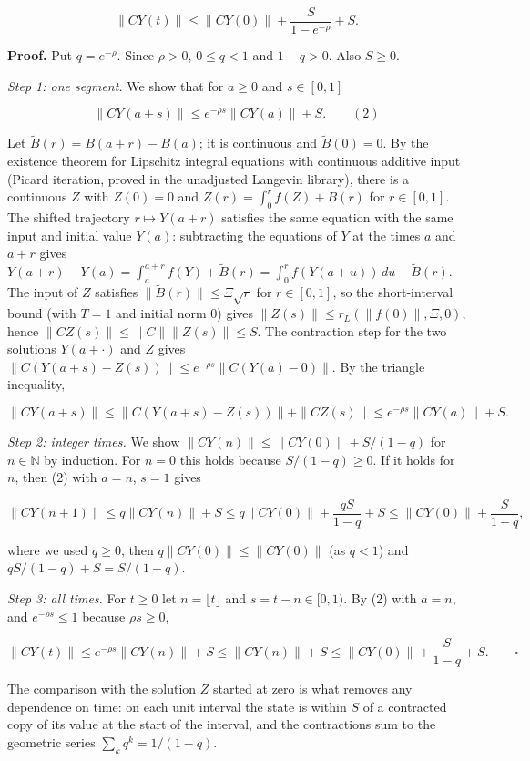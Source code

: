 \documentclass[11pt,a4paper]{report}
\begin{document}
\[\|CY(t)\|\le\|CY(0)\|+\frac{S}{1-e^{-\rho}}+S .\]


\textbf{Proof.} Put \(q=e^{-\rho}\). Since \(\rho>0\), \(0\le q<1\) and \(1-q>0\). Also \(S\ge0\).




\emph{Step 1: one segment.} We show that for \(a\ge0\) and \(s\in[0,1]\)


\[\|CY(a+s)\|\le e^{-\rho s}\|CY(a)\|+S.\qquad(2)\]


Let \(\tilde B(r)=B(a+r)-B(a)\); it is continuous and \(\tilde B(0)=0\). By the existence theorem for Lipschitz integral equations with continuous additive input (Picard iteration, proved in the unadjusted Langevin library), there is a continuous \(Z\) with \(Z(0)=0\) and \(Z(r)=\int_0^rf(Z)+\tilde B(r)\) for \(r\in[0,1]\). The shifted trajectory \(r\mapsto Y(a+r)\) satisfies the same equation with the same input and initial value \(Y(a)\): subtracting the equations of \(Y\) at the times \(a\) and \(a+r\) gives \(Y(a+r)-Y(a)=\int_a^{a+r}f(Y)+\tilde B(r)=\int_0^rf(Y(a+u))\,du+\tilde B(r)\). The input of \(Z\) satisfies \(\|\tilde B(r)\|\le\Xi\sqrt r\) for \(r\in[0,1]\), so the short-interval bound (with \(T=1\) and initial norm \(0\)) gives \(\|Z(s)\|\le r_L(\|f(0)\|,\Xi,0)\), hence \(\|CZ(s)\|\le\|C\|\|Z(s)\|\le S\). The contraction step for the two solutions \(Y(a+\cdot)\) and \(Z\) gives \(\|C(Y(a+s)-Z(s))\|\le e^{-\rho s}\|C(Y(a)-0)\|\). By the triangle inequality,


\[\|CY(a+s)\|\le\|C(Y(a+s)-Z(s))\|+\|CZ(s)\|\le e^{-\rho s}\|CY(a)\|+S .\]


\emph{Step 2: integer times.} We show \(\|CY(n)\|\le\|CY(0)\|+S/(1-q)\) for \(n\in\mathbb N\) by induction. For \(n=0\) this holds because \(S/(1-q)\ge0\). If it holds for \(n\), then (2) with \(a=n\), \(s=1\) gives


\[\|CY(n+1)\|\le q\|CY(n)\|+S\le q\|CY(0)\|+\frac{qS}{1-q}+S\le\|CY(0)\|+\frac{S}{1-q},\]


where we used \(q\ge0\), then \(q\|CY(0)\|\le\|CY(0)\|\) (as \(q<1\)) and \(qS/(1-q)+S=S/(1-q)\).




\emph{Step 3: all times.} For \(t\ge0\) let \(n=\lfloor t\rfloor\) and \(s=t-n\in[0,1)\). By (2) with \(a=n\), and \(e^{-\rho s}\le1\) because \(\rho s\ge0\),


\[\|CY(t)\|\le e^{-\rho s}\|CY(n)\|+S\le\|CY(n)\|+S\le\|CY(0)\|+\frac{S}{1-q}+S. \qquad\square\]


The comparison with the solution \(Z\) started at zero is what removes any dependence on time: on each unit interval the state is within \(S\) of a contracted copy of its value at the start of the interval, and the contractions sum to the geometric series \(\sum_kq^k=1/(1-q)\).
\end{document}
